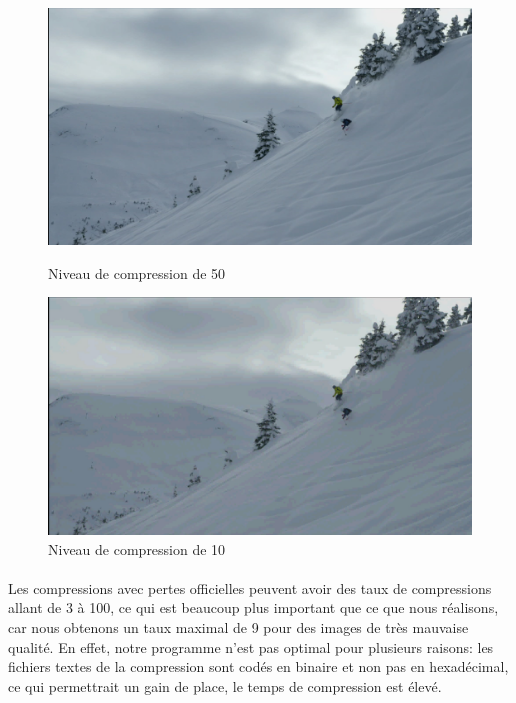 \documentclass[12pt]{article}
\begin{document}
\begin{figure}[h]
    \begin{minipage}[c]{.46\linewidth}
        \centering
        \includegraphics[scale=0.1]{skilatex50}
        \caption{Niveau de compression de 50}
    \end{minipage}
    \hfill%
    \begin{minipage}[c]{.46\linewidth}
        \centering
        \includegraphics[scale=0.1]{skilatex10}
        \caption{Niveau de compression de 10}
    \end{minipage}
\end{figure}
\paragraph{}
Les compressions avec pertes officielles peuvent avoir des taux de compressions allant de 3 à 100, ce qui est beaucoup plus important que ce que nous réalisons, car nous obtenons un taux maximal de 9 pour des images de très mauvaise qualité. En effet, notre programme n'est pas optimal pour plusieurs raisons: les fichiers textes de la compression sont codés en binaire et non pas en hexadécimal, ce qui permettrait un gain de place, le temps de compression est élevé.
\end{document}
